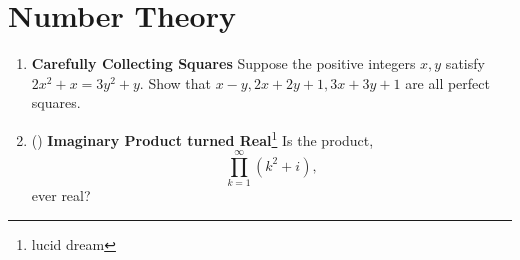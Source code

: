 \documentclass[11pt]{scrartcl}
\begin{document}
\newpage
\section{Number Theory}
\begin{enumerate}[label=\textbf{N\arabic*}.]
    \item \textbf{Carefully Collecting Squares} \newline
    Suppose the positive integers $x, y$ satisfy $2x^2 + x = 3y^2 + y$. Show that $x - y, 2x + 2y + 1, 3x + 3y + 1$ are all perfect squares.

    \item (\halfchili) \textbf{Imaginary Product turned Real}\footnote{lucid dream} \newline
    Is the product,
    \[ \prod_{k=1}^{\infty} (k^2 + i), \]
    ever real?
    
\end{enumerate}
\end{document}

